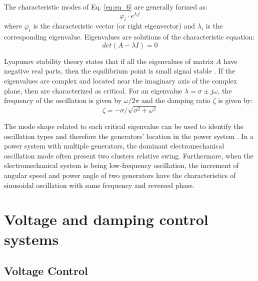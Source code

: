 \documentclass[conference,11pt]{IEEEtran}
\newcommand{\ignore}[2]{\hspace{0in}#2}
\begin{document}
The characteristic modes of Eq. \ref{eq:eq_6} are generally formed as:
\begin{equation}
    \label{eq:eq_8}
    \varphi_i \cdot e^{\lambda_i t}
\end{equation}
{\setlength{\parindent}{0cm}
where $\varphi_i$ is the characteristic vector (or right eigenvector) and $ \lambda_i $ is the corresponding eigenvalue. Eigenvalues are solutions of the characteristic equation:}
\begin{equation}
    \label{eq:eq_9}
    det ( A - \lambda I) = 0
\end{equation}

Lyapunov stability theory states that if all the eigenvalues of matrix $A$ have negative real parts, then the equilibrium point is small signal stable \cite{ref21}. If the eigenvalues are complex and located near the imaginary axis of the complex plane, then are characterized as critical. For an eigenvalue $\lambda = \sigma \pm j \omega$, the frequency of the oscillation is given by $\omega / 2\pi$ and the damping ratio $\zeta$ is given by:
\begin{equation}
    \label{eq:eq_10}
   \zeta = - \sigma / \sqrt{\sigma^2 + \omega^2}
\end{equation}

The mode shape related to each critical eigenvalue can be used to identify the oscillation types and therefore the generators' location in the power system \cite{ref21}. \ignore{, ref22} In a power system with multiple generators, the dominant electromechanical oscillation mode often present two clusters relative swing. Furthermore, when the electromechanical system is being low-frequency oscillation, the increment of angular speed and power angle of two generators have the characteristics of sinusoidal oscillation with same frequency and reversed phase. 

\section{Voltage and damping control systems}\label{s:control}

\subsection{Voltage Control}\label{ss:v_control}
\end{document}
